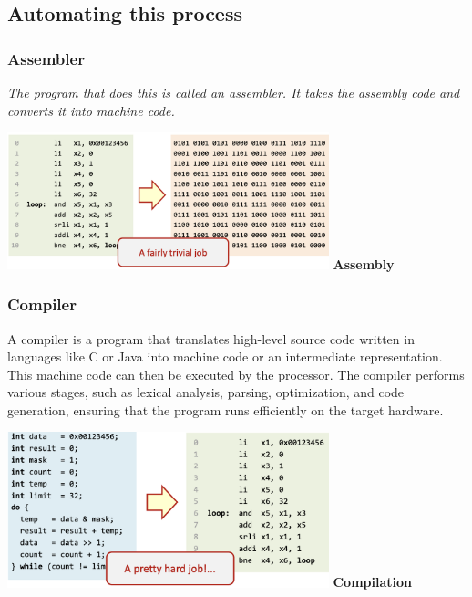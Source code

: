 \newpage
\subsection{Automating this process}
\subsubsection{Assembler}
\textit{The program that does this is called an assembler. It takes the assembly code and converts it into machine code.} \newline
\begin{center}
    \includegraphics[width=0.7\textwidth]{chapters/chapter1/images/assembler.png}
    \centering
    \textbf{Assembly}
\end{center}
\subsubsection{Compiler}
A compiler is a program that translates high-level source code written in languages like C or Java into machine code or an intermediate representation. This machine code can then be executed by the processor. The compiler performs various stages, such as lexical analysis, parsing, optimization, and code generation, ensuring that the program runs efficiently on the target hardware.
\begin{center}
    \includegraphics[width=0.7\textwidth]{chapters/chapter1/images/compiler.png}
    \centering
    \textbf{Compilation}
\end{center}

\newpage
